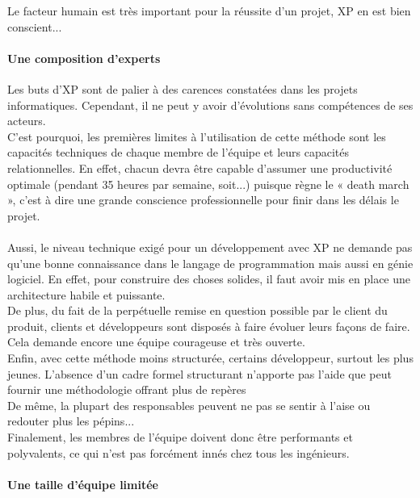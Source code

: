 \documentclass[]{article}
\let\oldparagraph\paragraph
\renewcommand{\paragraph}[1]{\oldparagraph{#1}\mbox{}}
\begin{document}
Le facteur humain est très important pour la réussite d'un projet, XP en
est bien conscient...




\hypertarget{une-composition-dexperts}{%
\paragraph{Une composition d'experts}\label{une-composition-dexperts}}

Les buts d'XP sont de palier à des carences constatées dans les projets
informatiques. Cependant, il ne peut y avoir d'évolutions sans
compétences de ses acteurs.\\
C'est pourquoi, les premières limites à l'utilisation de cette méthode
sont les capacités techniques de chaque membre de l'équipe et leurs
capacités relationnelles. En effet, chacun devra être capable d'assumer
une productivité optimale (pendant 35 heures par semaine, soit...)
puisque règne le « death march », c'est à dire une grande conscience
professionnelle pour finir dans les délais le projet.\\
~\\
Aussi, le niveau technique exigé pour un développement avec XP ne
demande pas qu'une bonne connaissance dans le langage de programmation
mais aussi en génie logiciel. En effet, pour construire des choses
solides, il faut avoir mis en place une architecture habile et
puissante.\\
De plus, du fait de la perpétuelle remise en question possible par le
client du produit, clients et développeurs sont disposés à faire évoluer
leurs façons de faire. Cela demande encore une équipe courageuse et très
ouverte.\\
Enfin, avec cette méthode moins structurée, certains développeur,
surtout les plus jeunes. L'absence d'un cadre formel structurant
n'apporte pas l'aide que peut fournir une méthodologie offrant plus de
repères\\
De même, la plupart des responsables peuvent ne pas se sentir à l'aise
ou redouter plus les pépins...\\
Finalement, les membres de l'équipe doivent donc être performants et
polyvalents, ce qui n'est pas forcément innés chez tous les ingénieurs.




\hypertarget{une-taille-duxe9quipe-limituxe9e}{%
\paragraph{Une taille d'équipe
limitée}\label{une-taille-duxe9quipe-limituxe9e}}
\end{document}
